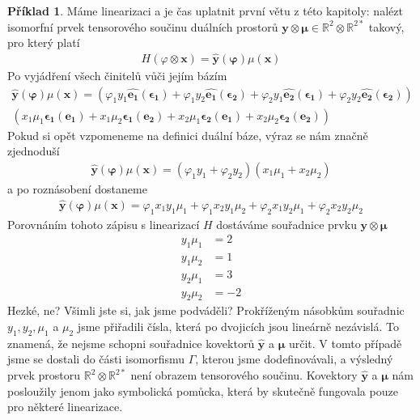 \documentclass[a5paper,12pt]{amsbook}
\theoremstyle{definition}
\newtheorem{example}{Příklad}[chapter]
\newcommand{\myvec}[1]{\bm{#1}}
\newcommand{\myspace}[1]{\mathbb{#1}}
\newcommand{\mycocovec}[1]{\mathbf{\widehat{#1}}}
\begin{document}
\begin{example}
Máme linearizaci a je čas uplatnit první větu z této kapitoly: nalézt isomorfní prvek tensorového
součinu duálních prostorů $\myvec{y}\otimes\myvec{\mu}\in \myspace{R}^2\otimes\myspace{R}^{2*}$
takový, pro který platí
\begin{equation*}
\begin{split}
H(\myspace{\varphi}\otimes\myvec{x}) = \mycocovec{y}(\myvec{\varphi})\myspace{\mu}(\myvec{x})
\end{split}
\end{equation*}
Po vyjádření všech činitelů vůči jejím bázím
\begin{equation*}
\begin{split}
\mycocovec{y}(\myvec{\varphi})\myspace{\mu}(\myvec{x})
  = (\varphi_1 y_1 \mycocovec{e_1}(\myvec{\epsilon_1})
  + \varphi_1 y_2 \mycocovec{e_1}(\myvec{\epsilon_2})
  + \varphi_2 y_1 \mycocovec{e_2}(\myvec{\epsilon_1})
  + \varphi_2 y_2 \mycocovec{e_2}(\myvec{\epsilon_2})) \\
    (x_1 \mu_1 \myvec{\epsilon_1}(\myvec{e_1})
  + x_1 \mu_2 \myvec{\epsilon_1}(\myvec{e_2})
  + x_2 \mu_1 \myvec{\epsilon_2}(\myvec{e_1})
  + x_2 \mu_2 \myvec{\epsilon_2}(\myvec{e_2}))
\end{split}
\end{equation*}
Pokud si opět vzpomeneme na definici duální báze, výraz se nám značně zjednoduší
\begin{equation*}
\begin{split}
\mycocovec{y}(\myvec{\varphi})\myspace{\mu}(\myvec{x})
  = (\varphi_1 y_1 + \varphi_2 y_2)(x_1 \mu_1 + x_2 \mu_2)
\end{split}
\end{equation*}
a po roznásobení dostaneme
\begin{equation*}
\begin{split}
\mycocovec{y}(\myvec{\varphi})\myspace{\mu}(\myvec{x})
= \varphi_1 x_1 y_1 \mu_1 + \varphi_1 x_2 y_1 \mu_2 + \varphi_2 x_1 y_2 \mu_1 + \varphi_2 x_2 y_2 \mu_2
\end{split}
\end{equation*}
Porovnáním tohoto zápisu s linearizací $H$ dostáváme souřadnice prvku $\myvec{y}\otimes\myvec{\mu}$
\begin{equation*}
\begin{split}
y_1 \mu_1 &= 2 \\
y_1 \mu_2 &= 1 \\
y_2 \mu_1 &= 3 \\
y_2 \mu_2 &= -2
\end{split}
\end{equation*}
Hezké, ne? Všimli jste si, jak jsme podváděli? Prokříženým násobkům souřadnic
$y_1, y_2, \mu_1$ a $\mu_2$ jsme přiřadili čísla, která po dvojicích jsou
lineárně nezávislá. To znamená, že nejsme schopni souřadnice kovektorů $\mycocovec{y}$
a $\myvec{\mu}$ určit. V tomto případě jsme se dostali do části isomorfismu
$\Gamma$, kterou jsme dodefinovávali, a výsledný prvek prostoru
$\myspace{R}^2\otimes\myspace{R}^{2*}$ není obrazem tensorového součinu.
Kovektory  $\mycocovec{y}$ a $\myvec{\mu}$ nám posloužily jenom jako symbolická
pomůcka, která by skutečně fungovala pouze pro některé linearizace.


\end{example}
\end{document}
